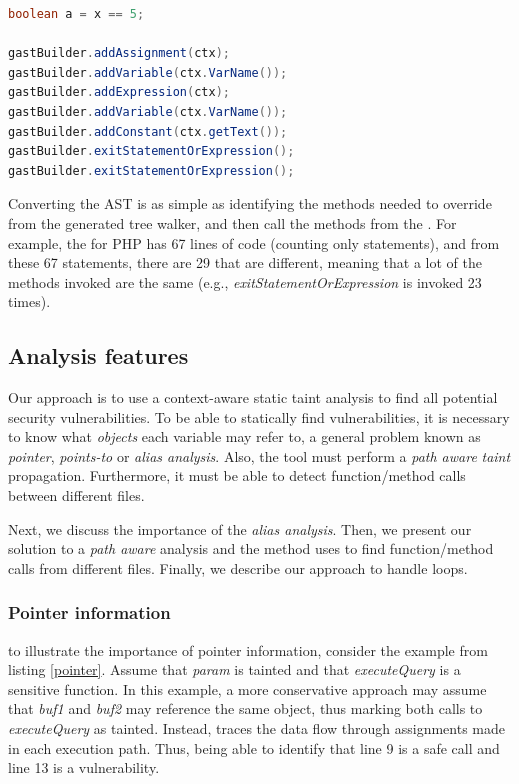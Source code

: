 \begin{lstlisting}[language=Java,
    showstringspaces=false,
    caption={Assignment build call sequence},
    label=assignmentconvertexample]
boolean a = x == 5;
    
gastBuilder.addAssignment(ctx);
gastBuilder.addVariable(ctx.VarName());
gastBuilder.addExpression(ctx);
gastBuilder.addVariable(ctx.VarName());
gastBuilder.addConstant(ctx.getText());
gastBuilder.exitStatementOrExpression();
gastBuilder.exitStatementOrExpression();
\end{lstlisting}

Converting the AST is as simple as identifying the methods needed to override from the generated tree walker, and then call the methods from the \astbuilder{}.
For example, the \converter{} for PHP has 67 lines of code (counting only statements), and from these 67 statements, there are 29 that are different, meaning that a lot of the methods invoked are the same (e.g., \textit{exitStatementOrExpression} is invoked 23 times). 


\subsection{Analysis features}

Our approach is to use a context-aware static taint analysis to find all potential security vulnerabilities. To be able to statically find vulnerabilities, it is necessary to know what \textit{objects} each variable may refer to, a general problem known as \textit{pointer}, \textit{points-to} or \textit{alias analysis}\cite{sridharan2013alias}. Also, the tool must perform a \textit{path aware} \textit{taint} propagation. Furthermore, it must be able to detect function/method calls between different files.

Next, we discuss the importance of the \textit{alias analysis}. Then, we present our solution to a \textit{path aware} analysis and the method \toolname{} uses to find function/method calls from different files. Finally, we describe our approach to handle loops.

\subsubsection{Pointer information} to illustrate the importance of pointer information, consider the example from listing \ref{pointer}. Assume that \textit{param} is tainted and that \textit{executeQuery} is a sensitive function. In this example, a more conservative approach may assume that \textit{buf1} and \textit{buf2} may reference the same object, thus marking both calls to \textit{executeQuery} as tainted. Instead, \toolname{} traces the data flow through assignments made in each execution path. Thus, being able to identify that line 9 is a safe call and line 13 is a vulnerability.


